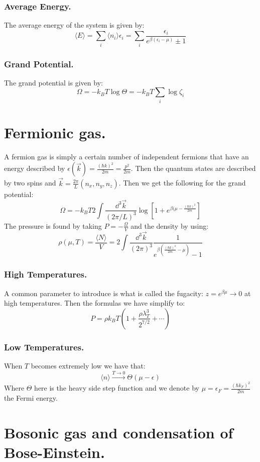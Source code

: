 \documentclass[10pt,a4paper]{book}
\begin{document}
\subsubsection{Average Energy.}
The average energy of the system is given by:
\[
\langle E \rangle = \sum_i \langle n_i \rangle \epsilon_i = \sum_i \frac{\epsilon_i}{e^{\beta(\epsilon_i - \mu)} \pm 1}
\]

\subsubsection{Grand Potential.}
The grand potential is given by:
\[
\Omega = - k_B T \log \Theta = -k_B T \sum_i \log \zeta_i
\]

\section{Fermionic gas.}
A fermion gas is simply a certain number of independent fermions that have an energy described by $\epsilon(\vec{k}) = \frac{(\hbar k)^2}{2m} = \frac{p^2}{2m}$. Then the quantum states are described by two spins and $\vec{k} = \frac{2\pi}{L}(n_x, n_y, n_z)$. Then we get the following for the grand potential:
\[
\Omega = -k_B T 2 \int \frac{\dd^3 \vec{k}}{(2 \pi/L)^3} \log[1 + e^{\beta(\mu - \frac{(\hbar k)^2}{2m}}]
\]
The pressure is found by taking $P = -\frac{\Omega}{V}$ and the density by using:
\[
\rho(\mu, T) = \frac{\langle N \rangle}{V} = 2 \int \frac{\dd^3 \vec{k}}{(2\pi)^3} \frac{1}{e^{\beta(\frac{(\hbar k)^2}{2m} - \mu)} - 1}
\]

\subsubsection{High Temperatures.}
A common parameter to introduce is what is called the fugacity: $z = e^{\beta \mu} \to 0$ at high temperatures. Then the formulas we have simplify to:
\[
P = \rho k_B T\left(1 + \frac{\rho \lambda_T^3}{2^{7/2}}  + \cdots \right)
\]

\subsubsection{Low Temperatures.}
When $T$ becomes extremely low we have that: 
\[
\langle n \rangle \stackrel{T \to 0}{\longrightarrow} \Theta(\mu - \epsilon)
\]
Where $\Theta$ here is the heavy side step function and we denote by $\mu = \epsilon_F = \frac{(\hbar k_F)^2}{2m}$ the Fermi energy.

\section{Bosonic gas and condensation of Bose-Einstein.}
\end{document}
